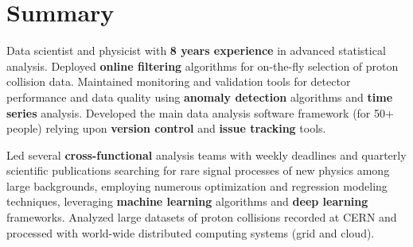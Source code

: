 \documentclass{myfancycv}
\begin{document}
\makeheader
\vspace*{-.35em}

  \vspace*{-0.5em}
\section{Summary}

Data scientist and physicist with {\bf 8 years experience} in advanced statistical analysis. Deployed {\bf online filtering} algorithms for on-the-fly selection of proton collision data. Maintained monitoring and validation tools for detector performance and data quality using {\bf anomaly detection} algorithms and {\bf time series} analysis. Developed the main data analysis software framework (for 50+ people) relying upon {\bf version control} and {\bf issue tracking} tools.

Led several {\bf cross-functional} analysis teams with weekly deadlines and quarterly scientific publications searching for rare signal processes of new physics among large backgrounds, employing numerous optimization and regression modeling techniques, leveraging {\bf machine learning} algorithms and {\bf deep learning} frameworks. Analyzed large datasets of proton collisions recorded at CERN and processed with world-wide distributed computing systems (grid and cloud).




\end{document}
